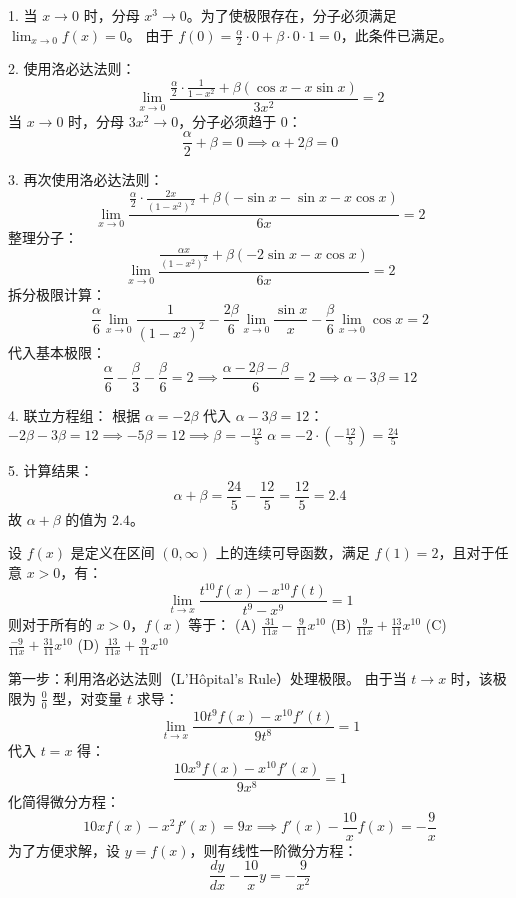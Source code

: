 \begin{questions}
\begin{solution}
    1. 当 $x \to 0$ 时，分母 $x^3 \to 0$。为了使极限存在，分子必须满足 $\lim_{x \to 0} f(x) = 0$。
    由于 $f(0) = \frac{\alpha}{2} \cdot 0 + \beta \cdot 0 \cdot 1 = 0$，此条件已满足。

    2. 使用洛必达法则：
    \[
    \lim_{x \to 0} \frac{\frac{\alpha}{2} \cdot \frac{1}{1-x^2} + \beta (\cos x - x \sin x)}{3x^2} = 2
    \]
    当 $x \to 0$ 时，分母 $3x^2 \to 0$，分子必须趋于 0：
    \[
    \frac{\alpha}{2} + \beta = 0 \implies \alpha + 2\beta = 0
    \]

    3. 再次使用洛必达法则：
    \[
    \lim_{x \to 0} \frac{\frac{\alpha}{2} \cdot \frac{2x}{(1-x^2)^2} + \beta (-\sin x - \sin x - x \cos x)}{6x} = 2
    \]
    整理分子：
    \[
    \lim_{x \to 0} \frac{\frac{\alpha x}{(1-x^2)^2} + \beta (-2\sin x - x \cos x)}{6x} = 2
    \]
    拆分极限计算：
    \[
    \frac{\alpha}{6} \lim_{x \to 0} \frac{1}{(1-x^2)^2} - \frac{2\beta}{6} \lim_{x \to 0} \frac{\sin x}{x} - \frac{\beta}{6} \lim_{x \to 0} \cos x = 2
    \]
    代入基本极限：
    \[
    \frac{\alpha}{6} - \frac{\beta}{3} - \frac{\beta}{6} = 2 \implies \frac{\alpha - 2\beta - \beta}{6} = 2 \implies \alpha - 3\beta = 12
    \]

    4. 联立方程组：
    根据 $\alpha = -2\beta$ 代入 $\alpha - 3\beta = 12$：
    $-2\beta - 3\beta = 12 \implies -5\beta = 12 \implies \beta = -\frac{12}{5}$
    $\alpha = -2 \cdot \left( -\frac{12}{5} \right) = \frac{24}{5}$

    5. 计算结果：
    \[
    \alpha + \beta = \frac{24}{5} - \frac{12}{5} = \frac{12}{5} = 2.4
    \]
    故 $\alpha + \beta$ 的值为 $2.4$。
\end{solution}

\question
设 $f(x)$ 是定义在区间 $(0, \infty)$ 上的连续可导函数，满足 $f(1) = 2$，且对于任意 $x > 0$，有：
\[
\lim_{t \to x} \frac{t^{10} f(x) - x^{10} f(t)}{t^9 - x^9} = 1
\]
则对于所有的 $x > 0$，$f(x)$ 等于：
(A) $\frac{31}{11x} - \frac{9}{11} x^{10}$ \quad (B) $\frac{9}{11x} + \frac{13}{11} x^{10}$ \quad (C) $\frac{-9}{11x} + \frac{31}{11} x^{10}$ \quad (D) $\frac{13}{11x} + \frac{9}{11} x^{10}$

\begin{solution}
第一步：利用洛必达法则（L'Hôpital's Rule）处理极限。
由于当 $t \to x$ 时，该极限为 $\frac{0}{0}$ 型，对变量 $t$ 求导：
\[
\lim_{t \to x} \frac{10t^9 f(x) - x^{10} f'(t)}{9t^8} = 1
\]
代入 $t = x$ 得：
\[
\frac{10x^9 f(x) - x^{10} f'(x)}{9x^8} = 1
\]
化简得微分方程：
\[
10x f(x) - x^2 f'(x) = 9x \implies f'(x) - \frac{10}{x} f(x) = -\frac{9}{x}
\]
为了方便求解，设 $y = f(x)$，则有线性一阶微分方程：
\[
\frac{dy}{dx} - \frac{10}{x} y = -\frac{9}{x^2}
\]


\end{solution}
\end{questions}
